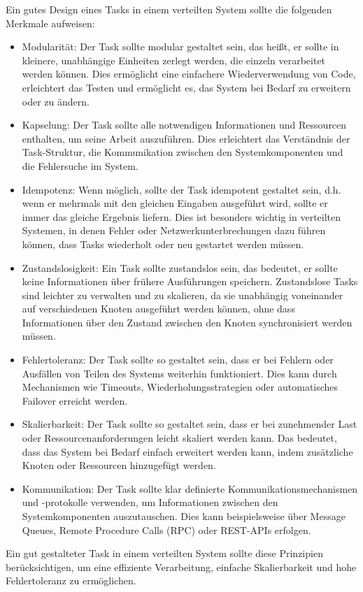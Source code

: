 Ein gutes Design eines Tasks in einem verteilten System sollte die folgenden Merkmale aufweisen:
\begin{itemize}
\item Modularität: Der Task sollte modular gestaltet sein, das heißt, er sollte in kleinere, unabhängige Einheiten zerlegt werden, die einzeln verarbeitet werden können. Dies ermöglicht eine einfachere Wiederverwendung von Code, erleichtert das Testen und ermöglicht es, das System bei Bedarf zu erweitern oder zu ändern.
\item Kapselung: Der Task sollte alle notwendigen Informationen und Ressourcen enthalten, um seine Arbeit auszuführen. Dies erleichtert das Verständnis der Task-Struktur, die Kommunikation zwischen den Systemkomponenten und die Fehlersuche im System.
\item Idempotenz: Wenn möglich, sollte der Task idempotent gestaltet sein, d.h. wenn er mehrmals mit den gleichen Eingaben ausgeführt wird, sollte er immer das gleiche Ergebnis liefern. Dies ist besonders wichtig in verteilten Systemen, in denen Fehler oder Netzwerkunterbrechungen dazu führen können, dass Tasks wiederholt oder neu gestartet werden müssen.
\item Zustandslosigkeit: Ein Task sollte zustandslos sein, das bedeutet, er sollte keine Informationen über frühere Ausführungen speichern. Zustandslose Tasks sind leichter zu verwalten und zu skalieren, da sie unabhängig voneinander auf verschiedenen Knoten ausgeführt werden können, ohne dass Informationen über den Zustand zwischen den Knoten synchronisiert werden müssen.
\item Fehlertoleranz: Der Task sollte so gestaltet sein, dass er bei Fehlern oder Ausfällen von Teilen des Systems weiterhin funktioniert. Dies kann durch Mechanismen wie Timeouts, Wiederholungsstrategien oder automatisches Failover erreicht werden.
\item Skalierbarkeit: Der Task sollte so gestaltet sein, dass er bei zunehmender Last oder Ressourcenanforderungen leicht skaliert werden kann. Das bedeutet, dass das System bei Bedarf einfach erweitert werden kann, indem zusätzliche Knoten oder Ressourcen hinzugefügt werden.
\item Kommunikation: Der Task sollte klar definierte Kommunikationsmechanismen und -protokolle verwenden, um Informationen zwischen den Systemkomponenten auszutauschen. Dies kann beispielsweise über Message Queues, Remote Procedure Calls (RPC) oder REST-APIs erfolgen.
\end{itemize}
Ein gut gestalteter Task in einem verteilten System sollte diese Prinzipien berücksichtigen, um eine effiziente Verarbeitung, einfache Skalierbarkeit und hohe Fehlertoleranz zu ermöglichen.

